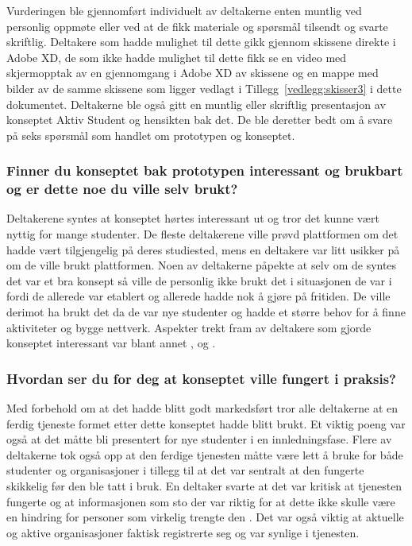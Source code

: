 Vurderingen ble gjennomført individuelt av deltakerne enten muntlig ved personlig oppmøte eller ved at de fikk materiale og spørsmål tilsendt og svarte skriftlig. Deltakere som hadde mulighet til dette gikk gjennom skissene direkte i Adobe XD, de som ikke hadde mulighet til dette fikk se en video med skjermopptak av en gjennomgang i Adobe XD av skissene og en mappe med bilder av de samme skissene som ligger vedlagt i Tillegg~\ref{vedlegg:skisser3} i dette dokumentet. Deltakerne ble også gitt en muntlig eller skriftlig presentasjon av konseptet Aktiv Student og hensikten bak det. De ble deretter bedt om å svare på seks spørsmål som handlet om prototypen og konseptet.

\subsubsection{Finner du konseptet bak prototypen interessant og brukbart og er dette noe du ville selv brukt?}
Deltakerene syntes at konseptet hørtes interessant ut og tror det kunne vært nyttig for mange studenter. De fleste deltakerene ville prøvd plattformen om det hadde vært tilgjengelig på deres studiested, mens en deltakere var litt usikker på om de ville brukt plattformen. Noen av deltakerne påpekte at selv om de syntes det var et bra konsept så ville de personlig ikke brukt det i situasjonen de var i fordi de allerede var etablert og allerede hadde nok å gjøre på fritiden. De ville derimot ha brukt det da de var nye studenter og hadde et større behov for å finne aktiviteter og bygge nettverk. Aspekter trekt fram av deltakere som gjorde konseptet interessant var blant annet ,  og .

\subsubsection{Hvordan ser du for deg at konseptet ville fungert i praksis?}

\setlength{\leftskip}{2em}
Med forbehold om at det hadde blitt godt markedsført tror alle deltakerne at en ferdig tjeneste formet etter dette konseptet hadde blitt brukt. Et viktig poeng var også at det måtte bli presentert for nye studenter i en innledningsfase. Flere av deltakerne tok også opp at den ferdige tjenesten måtte være lett å bruke for både studenter og organisasjoner i tillegg til at det var sentralt at den fungerte skikkelig før den ble tatt i bruk. En deltaker svarte at det var kritisk at tjenesten fungerte og at informasjonen som sto der var riktig for at dette ikke skulle være en hindring for personer som virkelig trengte den . Det var også viktig at aktuelle og aktive organisasjoner faktisk registrerte seg og var synlige i tjenesten. 

